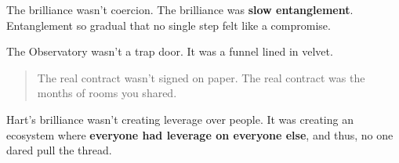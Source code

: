 \medskip



  



The brilliance wasn’t coercion.  The brilliance was \textbf{slow entanglement}. 
Entanglement so gradual that no single step felt like a compromise.

The Observatory wasn’t a trap door.  It was a funnel lined in velvet.

\begin{quote}
  The real contract wasn’t signed on paper.  The real contract was the months of rooms you shared.
\end{quote}

Hart’s brilliance wasn’t creating leverage over people. It was creating an ecosystem where 
\textbf{everyone had leverage on everyone else}, and thus, no one dared pull the thread.

\medskip


